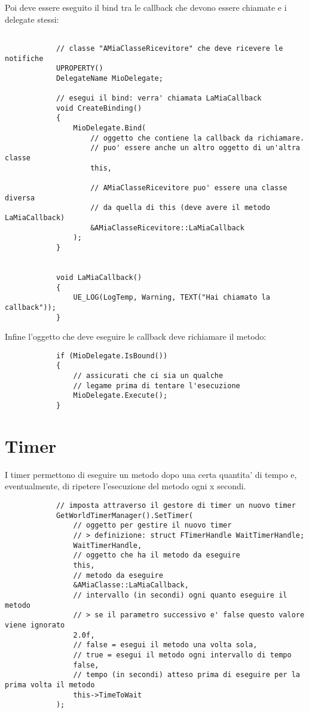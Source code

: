         Poi deve essere eseguito il bind tra le callback che devono essere chiamate e i delegate stessi:
        \begin{verbatim}

            // classe "AMiaClasseRicevitore" che deve ricevere le notifiche
            UPROPERTY()
            DelegateName MioDelegate;

            // esegui il bind: verra' chiamata LaMiaCallback
            void CreateBinding()
            {
                MioDelegate.Bind(
                    // oggetto che contiene la callback da richiamare.
                    // puo' essere anche un altro oggetto di un'altra classe
                    this,

                    // AMiaClasseRicevitore puo' essere una classe diversa
                    // da quella di this (deve avere il metodo LaMiaCallback)
                    &AMiaClasseRicevitore::LaMiaCallback
                );
            }


            void LaMiaCallback()
            {
                UE_LOG(LogTemp, Warning, TEXT("Hai chiamato la callback"));
            }
        \end{verbatim}

        Infine l'oggetto che deve eseguire le callback deve richiamare il metodo:
        \begin{verbatim}
            if (MioDelegate.IsBound())
            {
                // assicurati che ci sia un qualche
                // legame prima di tentare l'esecuzione
                MioDelegate.Execute();
            }
        \end{verbatim}


    \section{Timer}

        I timer permettono di eseguire un metodo dopo una certa quantita' di tempo e, eventualmente, di ripetere l'esecuzione del metodo ogni x secondi.

        \begin{verbatim}
            // imposta attraverso il gestore di timer un nuovo timer
            GetWorldTimerManager().SetTimer(
                // oggetto per gestire il nuovo timer
                // > definizione: struct FTimerHandle WaitTimerHandle;
                WaitTimerHandle,
                // oggetto che ha il metodo da eseguire
                this,
                // metodo da eseguire
                &AMiaClasse::LaMiaCallback,
                // intervallo (in secondi) ogni quanto eseguire il metodo
                // > se il parametro successivo e' false questo valore viene ignorato
                2.0f,
                // false = esegui il metodo una volta sola,
                // true = esegui il metodo ogni intervallo di tempo
                false,
                // tempo (in secondi) atteso prima di eseguire per la prima volta il metodo
                this->TimeToWait
            );
        \end{verbatim}

